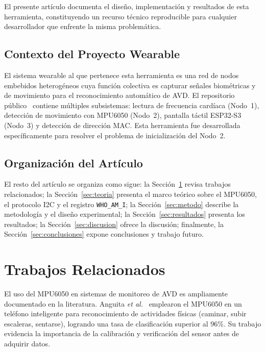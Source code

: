\documentclass[10pt,twocolumn,a4paper]{article}
\begin{document}
El presente artículo documenta el diseño, implementación y resultados
de esta herramienta, constituyendo un recurso técnico reproducible para
cualquier desarrollador que enfrente la misma problemática.

\subsection{Contexto del Proyecto Wearable}

El sistema wearable al que pertenece esta herramienta es una red de
nodos embebidos heterogéneos cuya función colectiva es capturar señales
biométricas y de movimiento para el reconocimiento automático de AVD.
El repositorio público~\cite{repo_github} contiene múltiples
subsistemas: lectura de frecuencia cardíaca (Nodo~1), detección de
movimiento con MPU6050 (Nodo~2), pantalla táctil ESP32-S3 (Nodo~3) y
detección de dirección MAC. Esta herramienta fue desarrollada
específicamente para resolver el problema de inicialización del Nodo~2.

\subsection{Organización del Artículo}

El resto del artículo se organiza como sigue: la Sección~\ref{sec:rw}
revisa trabajos relacionados; la Sección~\ref{sec:teoria} presenta el
marco teórico sobre el MPU6050, el protocolo I2C y el registro
\texttt{WHO\_AM\_I}; la Sección~\ref{sec:metodo} describe la metodología
y el diseño experimental; la Sección~\ref{sec:resultados} presenta los
resultados; la Sección~\ref{sec:discusion} ofrece la discusión;
finalmente, la Sección~\ref{sec:conclusiones} expone conclusiones y
trabajo futuro.

\section{Trabajos Relacionados}
\label{sec:rw}

El uso del MPU6050 en sistemas de monitoreo de AVD es ampliamente
documentado en la literatura. Anguita \textit{et al.}~\cite{anguita2012}
emplearon el MPU6050 en un teléfono inteligente para reconocimiento de
actividades físicas (caminar, subir escaleras, sentarse), logrando una
tasa de clasificación superior al 96\%. Su trabajo evidencia la
importancia de la calibración y verificación del sensor antes de
adquirir datos.
\end{document}
